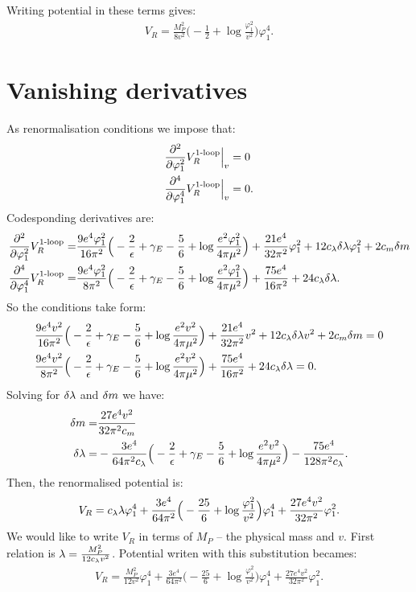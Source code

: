 Writing potential in these terms gives:
\begin{align}
V_R = \frac{M_P^2}{8v^2}\Big(-\frac{1}{2}+\log\frac{\varphi_1^2}{v^2}\Big)\varphi_1^4.
\end{align}
\section{Vanishing derivatives}
As renormalisation conditions we impose that:
\begin{align}
\frac{\partial^2 }{\partial \varphi_1^2}V_R^{\textrm{1-loop}}\Big|_{v} &= 0 \\
\frac{\partial^4 }{\partial \varphi_1^4}V_R^{\textrm{1-loop}}\Big|_{v} &= 0.
\end{align}
Codesponding derivatives are:
\begin{align}
\frac{\partial^2 }{\partial \varphi_1^2}V_R^{\textrm{1-loop}} = &\frac{9e^4\varphi_1^2}{16\pi^2}\Big(-\frac{2}{\epsilon}+\gamma_E-
\frac{5}{6}+\log{\frac{e^2\varphi_1^2}{4\pi\mu^2}}\Big)+\frac{21e^4}{32\pi^2}\varphi_1^2+ 
12c_\lambda\delta\lambda\varphi_1^2+2c_m\delta m \\
\frac{\partial^4 }{\partial \varphi_1^4}V_R^{\textrm{1-loop}} = &\frac{9e^4\varphi_1^2}{8\pi^2}\Big(-\frac{2}{\epsilon}+\gamma_E-
\frac{5}{6}+\log{\frac{e^2\varphi_1^2}{4\pi\mu^2}}\Big)+\frac{75e^4}{16\pi^2}+24c_\lambda\delta\lambda.
\end{align}
So the conditions take form:
\begin{align}
&\frac{9e^4v^2}{16\pi^2}\Big(-\frac{2}{\epsilon}+\gamma_E-
\frac{5}{6}+\log{\frac{e^2v^2}{4\pi\mu^2}}\Big)+\frac{21e^4}{32\pi^2}v^2+ 
12c_\lambda\delta\lambda v^2+2c_m\delta m = 0\\
&\frac{9e^4v^2}{8\pi^2}\Big(-\frac{2}{\epsilon}+\gamma_E-
\frac{5}{6}+\log{\frac{e^2v^2}{4\pi\mu^2}}\Big)+\frac{75e^4}{16\pi^2}+24c_\lambda\delta\lambda = 0.
\end{align}
Solving for $\delta\lambda$ and $\delta m$ we have:
\begin{align}
\delta m = &\frac{27e^4v^2}{32\pi^2c_m} \\
\delta\lambda = &-\frac{3e^4}{64\pi^2c_\lambda}\Big(-\frac{2}{\epsilon}+\gamma_E-
\frac{5}{6}+\log\frac{e^2v^2}{4\pi\mu^2}\Big)-\frac{75e^4}{128\pi^2c_\lambda}.
\end{align}
Then, the renormalised potential is:
\begin{align}
V_R = c_\lambda\lambda\varphi_1^4 + \frac{3e^4}{64\pi^2}\Big(- 
\frac{25}{6}+\log\frac{\varphi_1^2}{v^2}\Big)\varphi_1^4+
\frac{27e^4v^2}{32\pi^2}\varphi_1^2.
\end{align}
We would like to write $V_R$ in terms of $M_P$ -- the physical mass and $v$.
First relation is $\lambda = \frac{M_P^2}{12c_\lambda v^2}$. Potential writen with this substitution 
becames:
\begin{align}
V_R = \frac{M_P^2}{12v^2}\varphi_1^4 + \frac{3e^4}{64\pi^2}\Big(- \frac{25}{6} + \log
\frac{\varphi_1^2}{v^2}\Big)\varphi_1^4+
\frac{27e^4v^2}{32\pi^2}\varphi_1^2.
\end{align}
